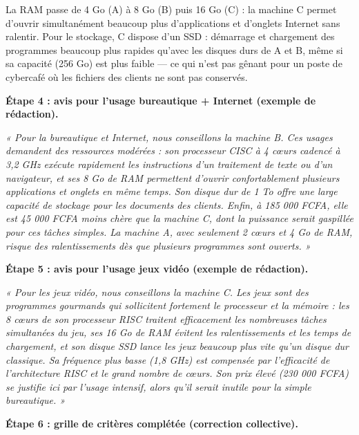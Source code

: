 \documentclass[11pt]{article}
\begin{document}
\begin{exoresolu}
La RAM passe de 4 Go (A) à 8 Go (B) puis 16 Go (C) : la machine C permet d'ouvrir simultanément beaucoup plus d'applications et d'onglets Internet sans ralentir. Pour le stockage, C dispose d'un SSD : démarrage et chargement des programmes beaucoup plus rapides qu'avec les disques durs de A et B, même si sa capacité (256 Go) est plus faible — ce qui n'est pas gênant pour un poste de cybercafé où les fichiers des clients ne sont pas conservés.

\textbf{Étape 4 : avis pour l'usage bureautique + Internet (exemple de rédaction).}

\emph{« Pour la bureautique et Internet, nous conseillons la machine B. Ces usages demandent des ressources modérées : son processeur CISC à 4 cœurs cadencé à 3,2 GHz exécute rapidement les instructions d'un traitement de texte ou d'un navigateur, et ses 8 Go de RAM permettent d'ouvrir confortablement plusieurs applications et onglets en même temps. Son disque dur de 1 To offre une large capacité de stockage pour les documents des clients. Enfin, à 185 000 FCFA, elle est 45 000 FCFA moins chère que la machine C, dont la puissance serait gaspillée pour ces tâches simples. La machine A, avec seulement 2 cœurs et 4 Go de RAM, risque des ralentissements dès que plusieurs programmes sont ouverts. »}

\textbf{Étape 5 : avis pour l'usage jeux vidéo (exemple de rédaction).}

\emph{« Pour les jeux vidéo, nous conseillons la machine C. Les jeux sont des programmes gourmands qui sollicitent fortement le processeur et la mémoire : les 8 cœurs de son processeur RISC traitent efficacement les nombreuses tâches simultanées du jeu, ses 16 Go de RAM évitent les ralentissements et les temps de chargement, et son disque SSD lance les jeux beaucoup plus vite qu'un disque dur classique. Sa fréquence plus basse (1,8 GHz) est compensée par l'efficacité de l'architecture RISC et le grand nombre de cœurs. Son prix élevé (230 000 FCFA) se justifie ici par l'usage intensif, alors qu'il serait inutile pour la simple bureautique. »}

\textbf{Étape 6 : grille de critères complétée (correction collective).}


\end{exoresolu}
\end{document}
